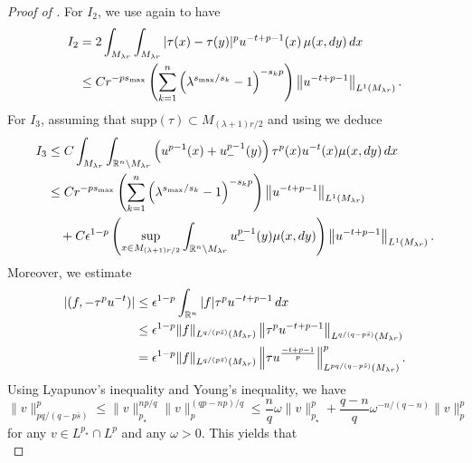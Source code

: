 \documentclass[10pt,a4paper]{amsart}
\newcommand{\R}{\mathbb{R}}
\renewcommand{\d}{\textnormal{d}}
\begin{document}
\begin{proof} [Proof of ]
For $I_2$, we use  again to have
\begin{equation*}
\begin{split}
I_2
&= 2\int_{M_{\lambda r}} \int_{M_{\lambda r}} |\tau(x)-\tau(y)|^p u^{-t+p-1}(x) \,\mu(x, \d y)\, \d x \\
&\leq C r^{-ps_{\max}}\left( \sum_{k=1}^n \left( \lambda^{s_{\max}/s_k}-1 \right)^{-s_k p} \right) \left\|u^{-t+p-1}\right\|_{L^1(M_{\lambda r})}.
\end{split}
\end{equation*}
For $I_3$, assuming that $\mathrm{supp}(\tau) \subset M_{(\lambda+1)r/2}$ and using  we deduce
\begin{equation*}
\begin{split}
I_3
&\leq C \int_{M_{\lambda r}} \int_{\mathbb{R}^n \setminus M_{\lambda r}} \left( u^{p-1}(x)+u_-^{p-1}(y) \right) \tau^p(x) u^{-t}(x) \mu(x, \d y)\, \d x \\
&\leq C r^{-ps_{\max}}\left( \sum_{k=1}^n \left( \lambda^{s_{\max}/s_k}-1 \right)^{-s_k p} \right) \left\|u^{-t+p-1}\right\|_{L^1(M_{\lambda r})} \\
&\quad + C\epsilon^{1-p} \left( \sup_{x \in M_{(\lambda+1)r/2}} \int_{\mathbb{R}^n \setminus M_{\lambda r}} u_-^{p-1}(y) \mu(x, \d y) \right) \left\|u^{-t+p-1}\right\|_{L^1(M_{\lambda r})}.
\end{split}
\end{equation*}
Moreover, we estimate
\begin{equation*}
\begin{split}
|(f, -\tau^p u^{-t})|
&\leq \epsilon^{1-p} \int_{\R^n} |f| \tau^p u^{-t+p-1} \,\d x \\
&\leq \epsilon^{1-p} \|f\|_{L^{q/(p\bar{s})}(M_{\lambda r})} \left\| \tau^p u^{-t+p-1} \right\|_{L^{q/(q-p\bar{s})}(M_{\lambda r})} \\
&= \epsilon^{1-p} \|f\|_{L^{q/(p\bar{s})}(M_{\lambda r})} \left\| \tau u^{\frac{-t+p-1}{p}} \right\|_{L^{pq/(q-p\bar{s})}(M_{\lambda r})}^p.
\end{split}
\end{equation*}
Using Lyapunov's inequality and Young's inequality, we have
\begin{equation*}
\|v\|_{pq/(q-p\bar{s})}^p \leq \|v\|_{p_\star}^{np/q} \|v\|_p^{(qp-np)/q} \leq \frac{n}{q} \omega \|v\|_{p_{\star}}^p + \frac{q-n}{q} \omega^{-n/(q-n)} \|v\|_p^p
\end{equation*}
for any $v \in L^{p_{\star}} \cap L^p$ and any $\omega > 0$. This yields that
\begin{equation*}

\end{equation*}
\end{proof}
\end{document}
